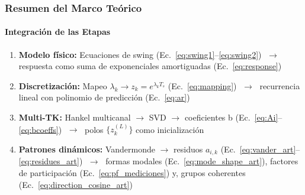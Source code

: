 \documentclass{beamer}
\begin{document}
\begin{frame}
\frametitle{Resumen del Marco Teórico}
\framesubtitle{Integración de las Etapas}

\begin{enumerate}
    \item \textbf{Modelo físico:} Ecuaciones de swing (Ec.~\ref{eq:swing1}--\ref{eq:swing2})
          $\;\to\;$ respuesta como suma de exponenciales amortiguadas (Ec.~\ref{eq:response})
    \vspace{0.3em}
    \item \textbf{Discretización:} Mapeo $\lambda_k \to z_k = e^{\lambda_k T_s}$ (Ec.~\ref{eq:mapping})
          $\;\to\;$ recurrencia lineal con polinomio de predicción (Ec.~\ref{eq:ar})
    \vspace{0.3em}
    \item \textbf{Multi-TK:} Hankel multicanal $\to$ SVD $\to$ coeficientes b (Ec.~\ref{eq:Ai}--\ref{eq:bcoeffs})
          $\;\to\;$ polos $\{z_k^{(L)}\}$ como inicialización
    \vspace{0.3em}

    \item \textbf{Patrones dinámicos:} Vandermonde $\to$ residuos $a_{i,k}$ (Ec.~\ref{eq:vander_art}--\ref{eq:residues_art})
          $\;\to\;$ formas modales (Ec.~\ref{eq:mode_shape_art}), factores de participación (Ec.~\ref{eq:pf_mediciones}) y,
          grupos coherentes (Ec.~\ref{eq:direction_cosine_art})
\end{enumerate}

\end{frame}
\end{document}
